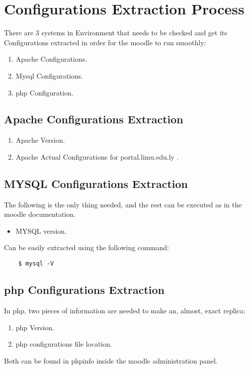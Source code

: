 \section*{Configurations Extraction Process}

There are 3 systems in Environment that needs to be checked and get its Configurations extracted in order for the moodle to run smoothly:

\begin{enumerate}
    \item Apache Configurations.
    \item Mysql Configurations.
    \item php Configuration.
\end{enumerate}

\subsection*{Apache Configurations Extraction}

\begin{enumerate}
    \item Apache Version.
    \item Apache Actual Configurations for portal.limu.edu.ly .
\end{enumerate}

\subsection*{MYSQL Configurations Extraction}

The following is the only thing needed, and the rest can be executed as in the moodle documentation.

\begin{itemize}
    \item MYSQL version.
\end{itemize}

Can be easily extracted using the following command:

\begin{lstlisting}
    $ mysql -V
\end{lstlisting}


\subsection*{php Configurations Extraction}

In php, two pieces of information are needed to make an, almost, exact replica:

\begin{enumerate}
    \item php Version.
    \item php configurations file location.
\end{enumerate}

Both can be found in phpinfo inside the moodle administration panel.